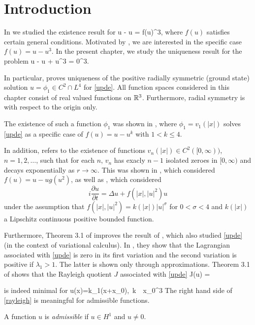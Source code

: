\section{Introduction}

In  we studied the existence result \cite{ber81} for
\be\label{updeber}
\Delta u - u = f(u)\quad{}\R^3,
\ee
where $f(u)$ satisfies certain general conditions. Motivated by ,
we are interested in the specific case $f(u) = u - u^3$.  In the present
chapter, we study the uniqueness result \cite{coffm} for the problem 
\be\label{upde}
\Delta u - u + u^3 = 0\quad{}\R^3.
\ee

In particular, \cite{coffm}  proves uniqueness of the positive radially
symmetric (ground state) solution $u=\phi_1\in C^2\cap L^4$ for \eqref{upde}.
All function spaces considered in this chapter consist of real valued functions
on $\mathbb{R}^3$. Furthermore, radial symmetry is with respect to the origin only. 

The existence of such a function $\phi_1$ was shown in \cite{nehari},
where $\phi_1=v_1(|x|)$ solves \eqref{upde} as a specific case of $f(u) = u -
u^k$ with $1<k\leq 4$. 

In addition, \cite{coffm} refers to the existence of functions $v_n(|x|)\in
C^2([0, \infty))$, $n=1, 2, \ldots$, such that for each $n$, $v_n$ has exacly
$n-1$ isolated zeroes in $[0, \infty)$ and decays exponentially as $r\to\infty$.
This was shown in \cite{ryder}, which considered $f(u) = u - ug(u^2)$,
as well as \cite{berger}, which considered
$$i\frac{\partial u}{\partial t} = \Delta u + f(|x|, |u|^2)u$$ 
under the assumption that $f(|x|, |u|^2)=k(|x|)|u|^\sigma$ for $0<\sigma<4$ and
$k(|x|)$ a Lipschitz continuous positive bounded function.

Furthermore, Theorem 3.1 of \cite{coffm} improves the result of \cite{robinson},
which also studied \eqref{upde} (in the context of variational calculus).  In
\cite{robinson}, they show that the Lagrangian associated with \eqref{upde} is
zero in its first variation and the second variation is positive if $\lambda_1 >
1$. The latter is shown only through approximations. Theorem 3.1 of \cite{coffm}
shows that the Rayleigh quotient $J$ associated with \eqref{upde}
\be\label{rayleigh} 
J(u) = 
\ee

is indeed minimal for %
\be\label{uts}
u(x)=k\phi_1(x+x_0),\quad{}~k~~x_0\in\R^3
\ee
The right hand side of \eqref{rayleigh} is
meaningful for admissible functions.

\begin{definition} 
    A function $u$ is \emph{admissible} if $u\in H^1$ and $u\neq 0$.
\end{definition}
